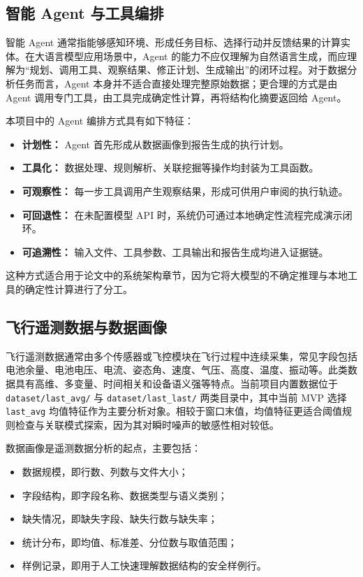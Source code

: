\documentclass[UTF8,a4paper,zihao=-4]{ctexart}
\begin{document}
\subsection{智能 Agent 与工具编排}

智能 Agent 通常指能够感知环境、形成任务目标、选择行动并反馈结果的计算实体。在大语言模型应用场景中，Agent 的能力不应仅理解为自然语言生成，而应理解为“规划、调用工具、观察结果、修正计划、生成输出”的闭环过程。对于数据分析任务而言，Agent 本身并不适合直接处理完整原始数据；更合理的方式是由 Agent 调用专门工具，由工具完成确定性计算，再将结构化摘要返回给 Agent。

本项目中的 Agent 编排方式具有如下特征：
\begin{itemize}
  \item \textbf{计划性：} Agent 首先形成从数据画像到报告生成的执行计划。
  \item \textbf{工具化：} 数据处理、规则解析、关联挖掘等操作均封装为工具函数。
  \item \textbf{可观察性：} 每一步工具调用产生观察结果，形成可供用户审阅的执行轨迹。
  \item \textbf{可回退性：} 在未配置模型 API 时，系统仍可通过本地确定性流程完成演示闭环。
  \item \textbf{可追溯性：} 输入文件、工具参数、工具输出和报告生成均进入证据链。
\end{itemize}

这种方式适合用于论文中的系统架构章节，因为它将大模型的不确定推理与本地工具的确定性计算进行了分工。

\subsection{飞行遥测数据与数据画像}

飞行遥测数据通常由多个传感器或飞控模块在飞行过程中连续采集，常见字段包括电池余量、电池电压、电流、姿态角、速度、气压、高度、温度、振动等。此类数据具有高维、多变量、时间相关和设备语义强等特点。当前项目内置数据位于 \texttt{dataset/last\_avg/} 与 \texttt{dataset/last\_last/} 两类目录中，其中当前 MVP 选择 \texttt{last\_avg} 均值特征作为主要分析对象。相较于窗口末值，均值特征更适合阈值规则检查与关联模式探索，因为其对瞬时噪声的敏感性相对较低。

数据画像是遥测数据分析的起点，主要包括：
\begin{itemize}
  \item 数据规模，即行数、列数与文件大小；
  \item 字段结构，即字段名称、数据类型与语义类别；
  \item 缺失情况，即缺失字段、缺失行数与缺失率；
  \item 统计分布，即均值、标准差、分位数与取值范围；
  \item 样例记录，即用于人工快速理解数据结构的安全样例行。
\end{itemize}
\end{document}
